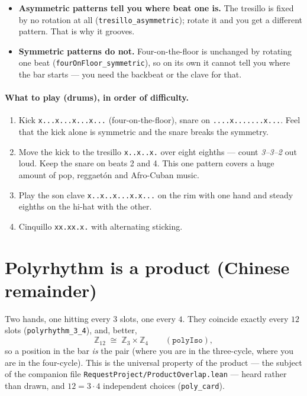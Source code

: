\documentclass[11pt,a4paper]{article}
\newcommand{\Z}{\mathbb{Z}}
\newcommand{\Ztw}{\Z_{12}}
\newcommand{\lean}[1]{\texttt{#1}}
\newcommand{\boxrow}[1]{\texttt{#1}}
\begin{document}
\begin{itemize}[leftmargin=1.4em]
\item \textbf{Asymmetric patterns tell you where beat one is.} The tresillo is
      fixed by no rotation at all (\lean{tresillo\_asymmetric}); rotate it and you
      get a different pattern. That is why it grooves.
\item \textbf{Symmetric patterns do not.} Four-on-the-floor is unchanged by
      rotating one beat (\lean{fourOnFloor\_symmetric}), so on its own it cannot
      tell you where the bar starts --- you need the backbeat or the clave for
      that.
\end{itemize}

\paragraph{What to play (drums), in order of difficulty.}
\begin{enumerate}[leftmargin=1.6em]
\item Kick \boxrow{x...x...x...x...} (four-on-the-floor), snare on \boxrow{....x.......x...}.
      Feel that the kick alone is symmetric and the snare breaks the symmetry.
\item Move the kick to the tresillo \boxrow{x..x..x.} over eight eighths --- count
      \emph{3--3--2} out loud. Keep the snare on beats 2 and 4. This one pattern
      covers a huge amount of pop, reggaetón and Afro-Cuban music.
\item Play the son clave \boxrow{x..x..x...x.x...} on the rim with one hand and
      steady eighths on the hi-hat with the other.
\item Cinquillo \boxrow{xx.xx.x.} with alternating sticking.
\end{enumerate}

\section{Polyrhythm is a product (Chinese remainder)}

Two hands, one hitting every $3$ slots, one every $4$. They coincide exactly
every $12$ slots (\lean{polyrhythm\_3\_4}), and, better,
\[
  \Ztw \;\cong\; \Z_3\times\Z_4 \qquad (\lean{polyIso}),
\]
so a position in the bar \emph{is} the pair (where you are in the three-cycle,
where you are in the four-cycle). This is the universal property of the product
--- the subject of the companion file \lean{RequestProject/ProductOverlap.lean}
--- heard rather than drawn, and $12=3\cdot 4$ independent choices
(\lean{poly\_card}).
\end{document}

